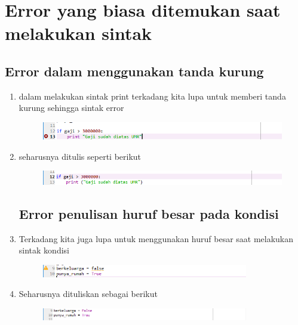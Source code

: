 \chapter*{Error yang biasa ditemukan saat melakukan sintak}
\section*{Error dalam menggunakan tanda kurung}
\begin{enumerate}
	\item dalam melakukan sintak print terkadang kita lupa untuk memberi tanda kurung sehingga sintak error
	\begin{figure} [h]
	\includegraphics[width=12cm]{error/er1.png}
	\centering
	\end{figure}
	
    \item seharusnya ditulis seperti berikut
	\begin{figure} [h]
	\includegraphics[width=12cm]{error/er2.png}
	\centering
	\end{figure}

\section*{Error penulisan huruf besar pada kondisi}
	
	
	\item Terkadang kita juga lupa untuk menggunakan huruf besar saat melakukan sintak kondisi 
	\begin{figure} [h]
	\includegraphics[width=9cm]{error/er3.png}
	\centering
	\end{figure}
	
	\item Seharusnya dituliskan sebagai berikut 
	\begin{figure} [h]
	\includegraphics[width=9cm]{error/er4.png}
	\centering
	\end{figure}
	
	
\end{enumerate}